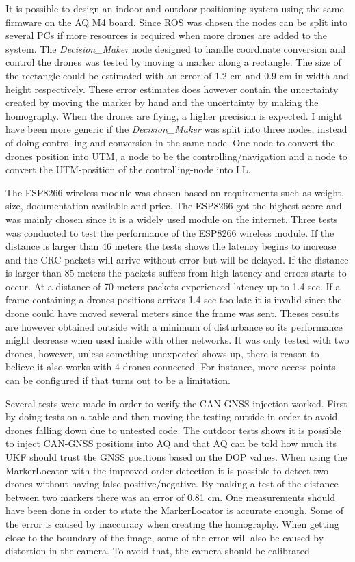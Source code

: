 It is possible to design an indoor and outdoor positioning system using the same firmware on the \ac{AQ} M4 board.
Since ROS was chosen the nodes can be split into several PCs if more resources is required when more drones are added to the system.
The \textit{Decision\_Maker} node designed to handle coordinate conversion and control the drones was tested by moving a marker along a rectangle. The size of the rectangle could be estimated with an error of 1.2 cm and 0.9 cm in width and height respectively. These error estimates does however contain the uncertainty created by moving the marker by hand and the uncertainty by making the homography. When the drones are flying, a higher precision is expected. I might have been more generic if the \textit{Decision\_Maker} was split into three nodes, instead of doing controlling and 
conversion in the same node. One node to convert the drones position into \ac{UTM}, a node to be the controlling/navigation and a node to convert the UTM-position of the controlling-node into \ac{LL}. 

The ESP8266 wireless module was chosen based on requirements such as weight, size, documentation available and price.
The ESP8266 got the highest score and was mainly chosen since it is a widely used module on the internet. 
Three tests was conducted to test the performance of the ESP8266 wireless module.
If the distance is larger than 46 meters the tests shows the latency begins to increase and the CRC packets will arrive without error but will be delayed.
If the distance is larger than 85 meters the packets suffers from high latency and errors starts to occur. At a distance of 70 meters packets experienced latency up to 1.4 sec. If a frame containing a drones positions arrives 1.4 sec too late it is invalid since the drone could have moved several meters since the frame was sent. Theses results are however obtained outside with a minimum of disturbance so its performance might decrease when used inside with other networks. It was only tested with two drones, however, unless something unexpected shows up, there is reason to believe it also works with 4 drones connected. For instance, more access points can be configured if that turns out to be a limitation.

Several tests were made in order to verify the CAN-GNSS injection worked. First by doing tests on a table and then moving the testing outside in order to avoid drones falling down due to untested code.
The outdoor tests shows it is possible to inject CAN-GNSS positions into \ac{AQ} and that \ac{AQ} can be told how much its UKF should trust the GNSS positions based on the DOP values.
When using the MarkerLocator with the improved order detection it is possible to detect two drones without having false positive/negative. By making a test of the distance between two markers there was an error of 0.81 cm. One measurements should have been done in order to state the MarkerLocator is accurate enough. Some of the error is caused by inaccuracy when creating the homography. When getting close to the boundary of the image, some of the error will also be caused by distortion in the camera. To avoid that, the camera should be calibrated.